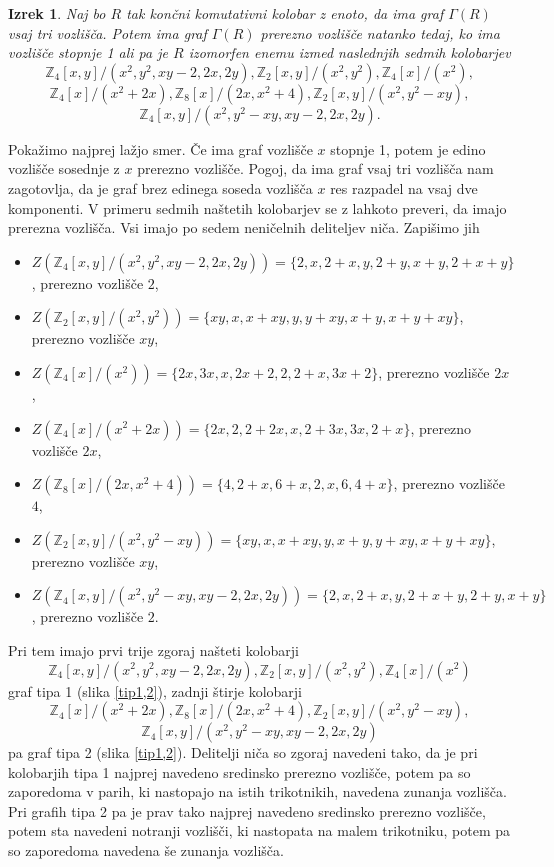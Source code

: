 \documentclass[a4paper, 12pt]{amsart}
\theoremstyle{definition} %
\theoremstyle{plain} %
\newtheorem{izrek}[definicija]{Izrek}
\newcommand{\Z}{\mathbb Z}
\begin{document}
\begin{izrek}
\label{izrek-cutVertex}
Naj bo $R$ tak končni komutativni kolobar z enoto, da ima graf $\Gamma(R)$ vsaj tri vozlišča. Potem ima graf $\Gamma(R)$ prerezno vozlišče natanko tedaj, ko ima vozlišče stopnje 1 ali pa je $R$ izomorfen enemu izmed naslednjih sedmih kolobarjev
$$
\Z_4[x,y]/(x^2, y^2, xy-2,2x,2y), \Z_2[x,y]/(x^2,y^2), \Z_4[x]/(x^2),
$$
$$
\Z_4[x]/(x^2+2x), \Z_8[x]/(2x,x^2 + 4), \Z_2[x,y]/(x^2, y^2 - xy),
$$
$$
\Z_4[x,y]/(x^2, y^2 - xy, xy-2,2x,2y).
$$
\end{izrek}

\proof
Pokažimo najprej lažjo smer. Če ima graf vozlišče $x$ stopnje 1, potem je edino vozlišče sosednje z $x$ prerezno vozlišče. Pogoj, da ima graf vsaj tri vozlišča nam zagotovlja, da je graf brez edinega soseda vozlišča $x$ res razpadel na vsaj dve komponenti. 
V primeru sedmih naštetih kolobarjev se z lahkoto preveri, da imajo prerezna vozlišča. Vsi imajo po sedem neničelnih deliteljev niča. Zapišimo jih
\begin{itemize}
\item $Z(\Z_4[x,y]/(x^2,y^2,xy-2,2x,2y)) = \{2,x,2+x,y,2+y,x+y,2+x+y\}$, prerezno vozlišče $2$,
\item $Z(\Z_2[x,y]/(x^2,y^2)) = \{xy,x,x+xy,y,y+xy,x+y,x+y+xy\}$, prerezno vozlišče $xy$,
\item $Z(\Z_4[x]/(x^2)) = \{2x,3x,x,2x+2,2,2+x,3x+2\}$, prerezno vozlišče $2x$,
\item $Z(\Z_4[x]/(x^2+2x)) = \{2x,2,2+2x,x,2+3x,3x,2+x\}$, prerezno vozlišče $2x$,
\item $Z(\Z_8[x]/(2x,x^2+4)) = \{4,2+x,6+x,2,x,6,4+x\}$, prerezno vozlišče $4$,
\item $Z(\Z_2[x,y]/(x^2,y^2-xy)) = \{xy,x,x+xy,y,x+y,y+xy,x+y+xy\}$, prerezno vozlišče $xy$,
\item $Z(\Z_4[x,y]/(x^2,y^2-xy,xy-2,2x,2y)) = \{2,x,2+x,y,2+x+y,2+y,x+y\}$, prerezno vozlišče $2$.
\end{itemize} 
Pri tem imajo prvi trije zgoraj našteti kolobarji 
$$
\Z_4[x,y]/(x^2,y^2,xy-2,2x,2y), \Z_2[x,y]/(x^2,y^2), \Z_4[x]/(x^2)
$$
graf tipa 1 (slika \ref{tip1,2}), zadnji štirje kolobarji 
$$
\Z_4[x]/(x^2+2x), \Z_8[x]/(2x,x^2 + 4), \Z_2[x,y]/(x^2, y^2 - xy),
$$
$$
\Z_4[x,y]/(x^2, y^2 - xy, xy-2,2x,2y)
$$
pa graf  tipa 2 (slika \ref{tip1,2}). Delitelji niča so zgoraj navedeni tako, da je pri kolobarjih tipa 1 najprej navedeno sredinsko prerezno vozlišče, potem pa so zaporedoma v parih, ki nastopajo na istih trikotnikih, navedena zunanja vozlišča. Pri grafih tipa 2 pa je prav tako najprej navedeno sredinsko prerezno vozlišče, potem sta navedeni notranji vozlišči, ki nastopata na malem trikotniku, potem pa so zaporedoma navedena še zunanja vozlišča.
\end{document}
